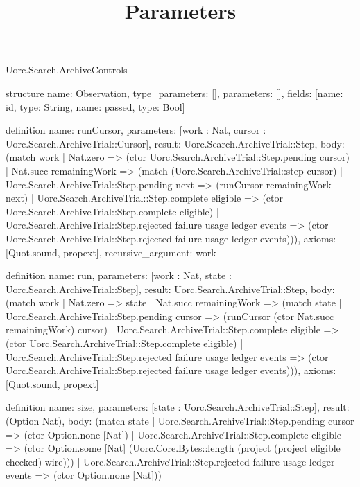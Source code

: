 \begin{lexlean}{Uorc.Search.ArchiveControls}
\title{Parameters}
\begin{semanticmodule}
structure{
  name: Observation,
  type_parameters: [],
  parameters: [],
  fields: [{name: id, type: String}, {name: passed, type: Bool}]
}

definition{
  name: runCursor,
  parameters: [work : Nat, cursor : Uorc.Search.ArchiveTrial::Cursor],
  result: Uorc.Search.ArchiveTrial::Step,
  body: (match work
    | Nat.zero => (ctor Uorc.Search.ArchiveTrial::Step.pending cursor)
    | Nat.succ remainingWork => (match (Uorc.Search.ArchiveTrial::step cursor)
      | Uorc.Search.ArchiveTrial::Step.pending next => (runCursor remainingWork next)
      | Uorc.Search.ArchiveTrial::Step.complete eligible => (ctor Uorc.Search.ArchiveTrial::Step.complete eligible)
      | Uorc.Search.ArchiveTrial::Step.rejected failure usage ledger events => (ctor Uorc.Search.ArchiveTrial::Step.rejected failure usage ledger events))),
  axioms: [Quot.sound, propext],
  recursive_argument: work
}

definition{
  name: run,
  parameters: [work : Nat, state : Uorc.Search.ArchiveTrial::Step],
  result: Uorc.Search.ArchiveTrial::Step,
  body: (match work
    | Nat.zero => state
    | Nat.succ remainingWork => (match state
      | Uorc.Search.ArchiveTrial::Step.pending cursor => (runCursor (ctor Nat.succ remainingWork) cursor)
      | Uorc.Search.ArchiveTrial::Step.complete eligible => (ctor Uorc.Search.ArchiveTrial::Step.complete eligible)
      | Uorc.Search.ArchiveTrial::Step.rejected failure usage ledger events => (ctor Uorc.Search.ArchiveTrial::Step.rejected failure usage ledger events))),
  axioms: [Quot.sound, propext]
}

definition{
  name: size,
  parameters: [state : Uorc.Search.ArchiveTrial::Step],
  result: (Option Nat),
  body: (match state
    | Uorc.Search.ArchiveTrial::Step.pending cursor => (ctor Option.none [Nat])
    | Uorc.Search.ArchiveTrial::Step.complete eligible => (ctor Option.some [Nat] (Uorc.Core.Bytes::length (project (project eligible checked) wire)))
    | Uorc.Search.ArchiveTrial::Step.rejected failure usage ledger events => (ctor Option.none [Nat]))
}


\end{semanticmodule}
\end{lexlean}
